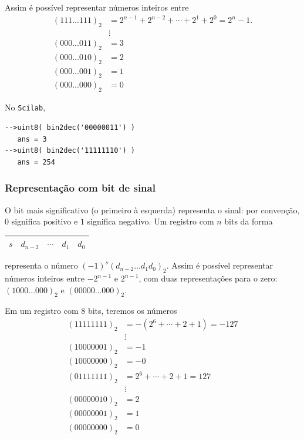 Assim é possível representar números inteiros entre
\begin{equation*}
\begin{split}
  (111...111)_2 & = 2^{n-1}+2^{n-2}+\cdots+2^1+2^0=2^n-1.\\
                &\vdots\\
  (000...011)_2 &= 3 \\
  (000...010)_2 &= 2 \\
  (000...001)_2 &= 1 \\
  (000...000)_2 & = 0 
\end{split}
\end{equation*}

\ifisscilab
\begin{ex}
  No \verb+Scilab+,
\begin{verbatim}
-->uint8( bin2dec('00000011') )
   ans = 3
-->uint8( bin2dec('11111110') )
   ans = 254
\end{verbatim}
\end{ex}
\fi

\subsubsection{Representação com bit de sinal}
O bit mais significativo (o primeiro à esquerda) representa o sinal: por convenção, $0$ significa positivo e $1$ significa negativo. Um registro com $n$ bits da forma
\begin{tabular}{|c|c|c|c|c|} \hline
    $s$ & $d_{n-2}$ & $\cdots$ & $d_1$ & $d_0$ \\\hline
\end{tabular}
representa o número $(-1)^s(d_{n-2}...d_1d_0)_2$. Assim é possível representar números inteiros entre $-2^{n-1}$ e $2^{n-1}$, com duas representações para o zero: $(1000...000)_2$ e $(00000...000)_2$.

\begin{ex}
Em um registro com $8$ bits, teremos os números
\begin{equation*}
\begin{split}
 (11111111)_2 &= -(2^{6}+\cdots+2+1)=-127\\
 &\vdots    \\
 (10000001)_2 &= -1 \\
 (10000000)_2 &= -0 \\
 (01111111)_2 &= 2^6+\cdots+2+1=127 \\
 &\vdots    \\
 (00000010)_2 &= 2 \\
 (00000001)_2 &= 1 \\
 (00000000)_2 &= 0 
\end{split}  
\end{equation*}
\end{ex}


